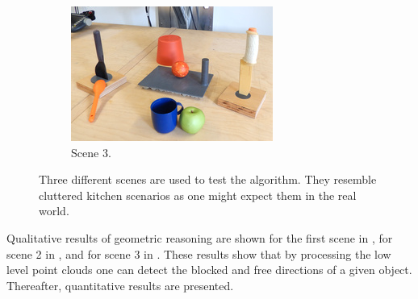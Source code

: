 \begin{figure}
\begin{subfigure}[]{0.32\textwidth}
    \includegraphics[width=\textwidth]{./figures/sec/scene_photos/affordance_scene5_wide1.jpg}
    \caption{Scene 3.}
    \label{fig:sec_enriched_geometricalreasoning_experiments_scenesexample_scenes3}
  \end{subfigure}
  \caption{Three different scenes are used to test the algorithm. They resemble cluttered kitchen scenarios as one might expect them in the real world.}
  \label{fig:sec_enriched_geometricalreasoning_experiments_scenesexample}
\end{figure}

Qualitative results of geometric reasoning are shown for the first scene in , for scene 2 in , and for scene 3 in .
These results show that by processing the low level point clouds one can detect the blocked and free directions of a given object.
Thereafter, quantitative results are presented.

